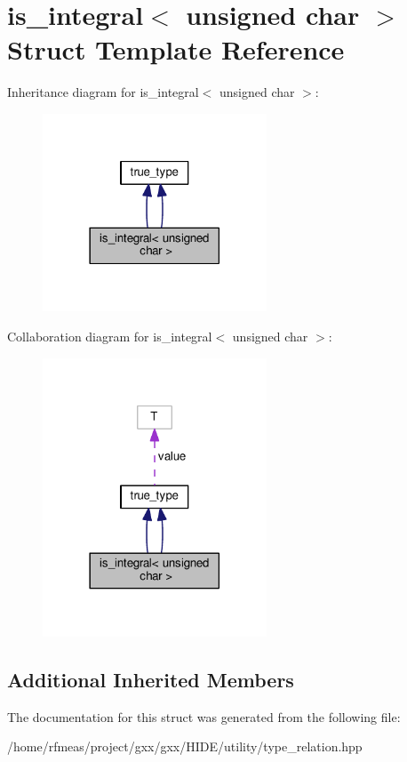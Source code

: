 \hypertarget{structis__integral_3_01unsigned_01char_01_4}{}\section{is\+\_\+integral$<$ unsigned char $>$ Struct Template Reference}
\label{structis__integral_3_01unsigned_01char_01_4}


Inheritance diagram for is\+\_\+integral$<$ unsigned char $>$\+:
\nopagebreak
\begin{figure}[H]
\begin{center}
\leavevmode
\includegraphics[width=189pt]{structis__integral_3_01unsigned_01char_01_4__inherit__graph}
\end{center}
\end{figure}


Collaboration diagram for is\+\_\+integral$<$ unsigned char $>$\+:
\nopagebreak
\begin{figure}[H]
\begin{center}
\leavevmode
\includegraphics[width=189pt]{structis__integral_3_01unsigned_01char_01_4__coll__graph}
\end{center}
\end{figure}
\subsection*{Additional Inherited Members}


The documentation for this struct was generated from the following file\+:\begin{DoxyCompactItemize}
\item 
/home/rfmeas/project/gxx/gxx/\+H\+I\+D\+E/utility/type\+\_\+relation.\+hpp\end{DoxyCompactItemize}
